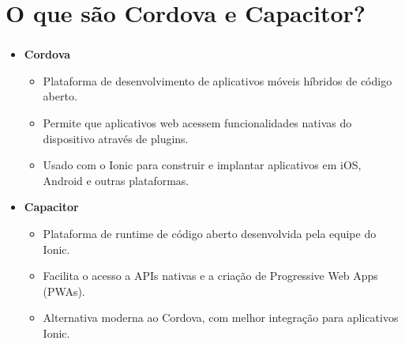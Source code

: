 \documentclass[aspectratio=169]{beamer}
\begin{document}
	
	\section{O que são Cordova e Capacitor?}
	\begin{frame}[fragile]
		\frametitle{\secname}
		\begin{itemize}
			\item \textbf{Cordova}
			\begin{itemize}
				\item Plataforma de desenvolvimento de aplicativos móveis híbridos de código aberto.
				\item Permite que aplicativos web acessem funcionalidades nativas do dispositivo através de plugins.
				\item Usado com o Ionic para construir e implantar aplicativos em iOS, Android e outras plataformas.
			\end{itemize}
			\item \textbf{Capacitor}
			\begin{itemize}
				\item Plataforma de runtime de código aberto desenvolvida pela equipe do Ionic.
				\item Facilita o acesso a APIs nativas e a criação de Progressive Web Apps (PWAs).
				\item Alternativa moderna ao Cordova, com melhor integração para aplicativos Ionic.
			\end{itemize}
		\end{itemize}
	\end{frame}

	
	
\end{document}
